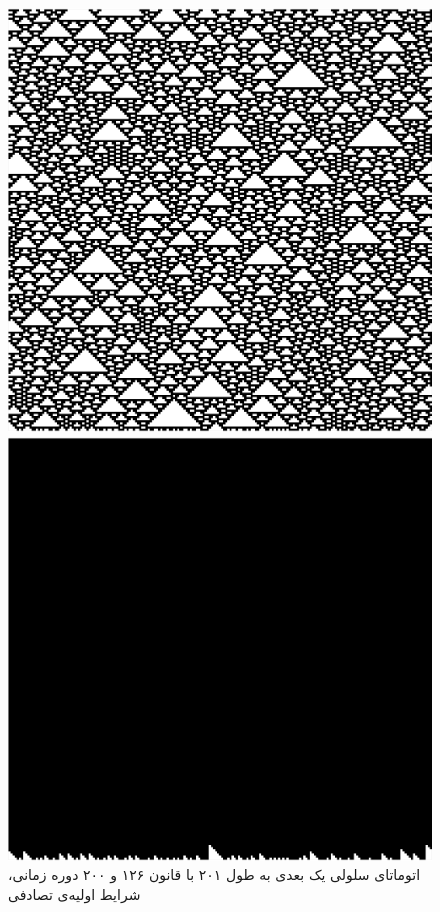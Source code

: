 \documentclass[11pt, a4paper]{article}
\begin{document}
\begin{figure}[!tbp]
  \begin{minipage}[b]{0.3\textwidth}
    \includegraphics[width=\textwidth]{q3-126-rand}
    \caption{اتوماتای سلولی یک بعدی به طول ۲۰۱ با قانون ۱۲۶ و ۲۰۰ دوره زمانی، شرایط اولیه‌ی تصادفی}
    \label{fig:q3-126-rand}
  \end{minipage}
  \hfill
  \begin{minipage}[b]{0.3\textwidth}
    \includegraphics[width=\textwidth]{q3-238-rand}

\end{minipage}
\end{figure}
\end{document}
